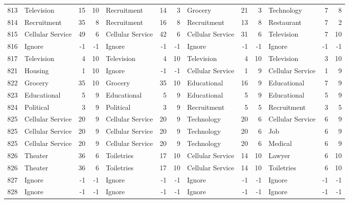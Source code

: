 \begin{figure}[htbp]
\begin{tabular}{rlrrlrrlrrlrr}
    813   & Television & 15    & 10    & Recruitment & 14    & 3     & Grocery & 21    & 3     & Technology & 7     & 8 \\
    814   & Recruitment & 35    & 8     & Recruitment & 16    & 8     & Recruitment & 13    & 8     & Restaurant & 7     & 2 \\
    815   & Cellular Service & 49    & 6     & Cellular Service & 42    & 6     & Cellular Service & 31    & 6     & Television & 7     & 10 \\
    816   & Ignore & -1    & -1    & Ignore & -1    & -1    & Ignore & -1    & -1    & Ignore & -1    & -1 \\
    817   & Television & 4     & 10    & Television & 4     & 10    & Television & 4     & 10    & Television & 3     & 10 \\
    821   & Housing & 1     & 10    & Ignore & -1    & -1    & Cellular Service & 1     & 9     & Cellular Service & 1     & 9 \\
    822   & Grocery & 35    & 10    & Grocery & 35    & 10    & Educational & 16    & 9     & Educational & 7     & 9 \\
    823   & Educational & 5     & 9     & Educational & 5     & 9     & Educational & 5     & 9     & Educational & 5     & 9 \\
    824   & Political & 3     & 9     & Political & 3     & 9     & Recruitment & 5     & 5     & Recruitment & 3     & 5 \\
    825   & Cellular Service & 20    & 9     & Cellular Service & 20    & 9     & Technology & 20    & 6     & Cellular Service & 6     & 9 \\
    825   & Cellular Service & 20    & 9     & Cellular Service & 20    & 9     & Technology & 20    & 6     & Job   & 6     & 9 \\
    825   & Cellular Service & 20    & 9     & Cellular Service & 20    & 9     & Technology & 20    & 6     & Medical & 6     & 9 \\
    826   & Theater & 36    & 6     & Toiletries & 17    & 10    & Cellular Service & 14    & 10    & Lawyer & 6     & 10 \\
    826   & Theater & 36    & 6     & Toiletries & 17    & 10    & Cellular Service & 14    & 10    & Toiletries & 6     & 10 \\
    827   & Ignore & -1    & -1    & Ignore & -1    & -1    & Ignore & -1    & -1    & Ignore & -1    & -1 \\
    828   & Ignore & -1    & -1    & Ignore & -1    & -1    & Ignore & -1    & -1    & Ignore & -1    & -1 \\

\end{tabular}
\end{figure}
